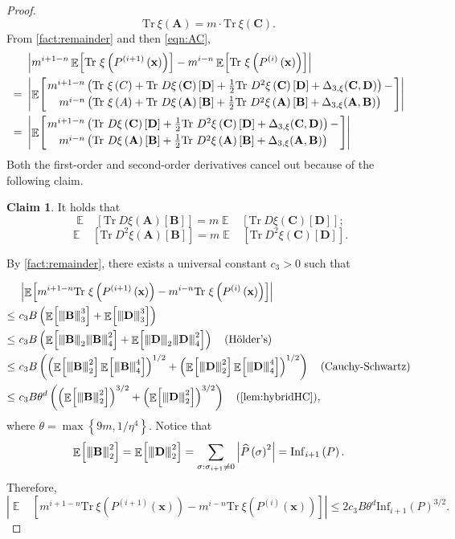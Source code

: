 \documentclass[11pt]{article}
\theoremstyle{plain}
\theoremstyle{definition}
\newtheorem{claim}[theorem]{Claim}
\newcommand {\minusspace} {\: \! \!}
\newcommand {\Fn} [2] {\ensuremath{ #1 \minusspace \Br{ #2 } }}
\newcommand {\set} [1] {\ensuremath{ \left\lbrace #1 \right\rbrace }}
\newcommand {\br} [1] {\ensuremath{ \left( #1 \right) }}
\newcommand {\Br} [1] {\ensuremath{ \left[ #1 \right] }}
\newcommand {\ab} [1] {\ensuremath{ \left| #1 \right| }}
\DeclareMathOperator*{\bigE}{\mathbb{E}}
\newcommand {\expec} [2] {\Fn{\bigE_{\substack{#1}}}{#2}}
\newcommand{\nnorm}[1]{{\left\vert\kern-0.25ex\left\vert\kern-0.25ex\left\vert #1
		\right\vert\kern-0.25ex\right\vert\kern-0.25ex\right\vert}}
\newcommand {\Tr} {\ensuremath{ \mathrm{Tr} }}
\newcommand{\randx}{\ensuremath{\mathbf{x}}}
\newcommand{\randA}{\ensuremath{\mathbf{A}}}
\newcommand{\randB}{\ensuremath{\mathbf{B}}}
\newcommand{\randC}{\ensuremath{\mathbf{C}}}
\newcommand{\randD}{\ensuremath{\mathbf{D}}}
\newcommand{\1}{\mathbb{1}} %
\begin{document}
\begin{proof}
\begin{equation}\label{eqn:AC}
\Tr~\xi\br{\mathbf{A}}=m\cdot\Tr~\xi\br{\mathbf{C}}.
\end{equation}
From \cref{fact:remainder} and then \cref{eqn:AC},
	\begin{align*} &\ab{m^{i+1-n}\expec{}{\Tr~\xi\br{P^{\br{i+1}}\br{\randx}}}-m^{i-n}\expec{}{\Tr~\xi\br{P^{\br{i}}\br{\randx}}}}\\
 =~&\ab{\expec{}{\genfrac{}{}{0pt}{}{ m^{i+1-n}\br{\Tr~\xi\br{C}+\Tr~D\xi\br{\mathbf{C}}\Br{\mathbf{D}}+\frac{1}{2}\Tr~D^2\xi\br{\mathbf{C}}\Br{\mathbf{D}}+\Delta_{3,\xi}(\randC,\randD)}-}{ m^{i-n}\br{\Tr~\xi\br{A}+\Tr~D\xi\br{\mathbf{A}}\Br{\mathbf{B}}+\frac{1}{2}\Tr~D^2\xi\br{\mathbf{A}}\Br{\mathbf{B}}+\Delta_{3,\xi}(\randA,\randB)}}}}\\
	=~&\ab{\expec{}{\genfrac{}{}{0pt}{}{ m^{i+1-n}\br{\Tr~D\xi\br{\mathbf{C}}\Br{\mathbf{D}}+\frac{1}{2}\Tr~D^2\xi\br{\mathbf{C}}\Br{\mathbf{D}}+\Delta_{3,\xi}(\randC,\randD)}-}{ m^{i-n}\br{\Tr~D\xi\br{\mathbf{A}}\Br{\mathbf{B}}+\frac{1}{2}\Tr~D^2\xi\br{\mathbf{A}}\Br{\mathbf{B}}+\Delta_{3,\xi}(\randA,\randB)}}}}
\end{align*}
Both the first-order and second-order derivatives cancel out because of the following claim.
\begin{claim}\label{claim:1}
	It holds that
	\[\expec{}{\Tr~D\xi\br{\mathbf{A}}\Br{\mathbf{B}}}=m\expec{}{\Tr~D\xi\br{\mathbf{C}}\Br{\mathbf{D}}};\]	\[\expec{}{\Tr~D^2\xi\br{\mathbf{A}}\Br{\mathbf{B}}}=m\expec{}{\Tr~D^2\xi\br{\mathbf{C}}\Br{\mathbf{D}}}.\]		
\end{claim}
\bigskip
By \cref{fact:remainder}, there exists a universal constant $c_3>0$ such that

\begin{align*}
&\ab{\expec{}{m^{i+1-n}\Tr~\xi\br{P^{\br{i+1}}\br{\randx}}-m^{i-n}\Tr~\xi\br{P^{\br{i}}\br{\randx}}}}\\
\leq ~&c_3 B \br{\expec{}{\nnorm{\randB}_3^3}+\expec{}{\nnorm{\randD}_3^3}}\\
\leq ~&c_3 B \br{\expec{}{\nnorm{\randB}_2\nnorm{\randB}_4^2}+\expec{}{\nnorm{\randD}_2\nnorm{\randD}_4^2}}\quad\mbox{(H\"older's)}\\
\leq ~&c_3 B \br{\br{\expec{}{\nnorm{\randB}_2^2}\expec{}{\nnorm{\randB}_4^4}}^{1/2}+\br{\expec{}{\nnorm{\randD}_2^2}\expec{}{\nnorm{\randD}_4^4}}^{1/2}}\quad\mbox{(Cauchy-Schwartz)}\\
\leq ~&c_3 B \theta^d\br{\br{\expec{}{\nnorm{\randB}_2^2}}^{3/2}+\br{\expec{}{\nnorm{\randD}_2^2}}^{3/2}}\quad\mbox{(\cref{lem:hybridHC})},
\end{align*}
where $\theta=\max\set{9m,1/\eta^4}$. Notice that
	\[\expec{}{\nnorm{\randB}_2^2}=\expec{}{\nnorm{\randD}_2^2}=\sum_{\sigma:\sigma_{i+1}\neq 0}\ab{\widehat{P}\br{\sigma}^2}=\mathrm{Inf}_{i+1}\br{P}.\]
	Therefore,	\[\ab{\expec{}{m^{i+1-n}\Tr~\xi\br{P^{\br{i+1}}\br{\randx}}-m^{i-n}\Tr~\xi\br{P^{\br{i}}\br{\randx}}}}\leq 2c_3 B \theta^d\mathrm{Inf}_{i+1}\br{P}^{3/2}.\]
	

\end{proof}
\end{document}
